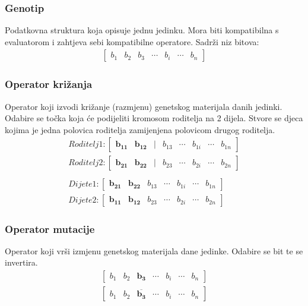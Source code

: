 \documentclass[times, utf8, zavrsni]{fer}
\begin{document}
\subsubsection{Genotip}
Podatkovna struktura koja opisuje jednu jedinku. Mora biti kompatibilna s evaluatorom i zahtjeva sebi kompatibilne operatore. Sadrži niz bitova:
\begin{align*}
\begin{bmatrix}
b_1 & b_2 & b_3 & \cdots & b_i & \cdots & b_n
\end{bmatrix}
\end{align*}
\subsubsection{Operator križanja}
Operator koji izvodi križanje (razmjenu) genetskog materijala danih jedinki. Odabire se točka koja će podijeliti kromosom roditelja na 2 dijela. Stvore se djeca kojima je jedna polovica roditelja zamijenjena polovicom drugog roditelja.
\begin{align*}
Roditelj 1:
\begin{bmatrix}
\mathbf{b_{11}} & \mathbf{b_{12}} & | & b_{13} & \cdots & b_{1i} & \cdots & b_{1n}
\end{bmatrix} \\
Roditelj 2:
\begin{bmatrix}
\mathbf{b_{21}} & \mathbf{b_{22}} & | & b_{23} & \cdots & b_{2i} & \cdots & b_{2n}
\end{bmatrix} \\\\
Dijete 1:
\begin{bmatrix}
\mathbf{b_{21}} & \mathbf{b_{22}} & b_{13} & \cdots & b_{1i} & \cdots & b_{1n}
\end{bmatrix} \\
Dijete 2:
\begin{bmatrix}
\mathbf{b_{11}} & \mathbf{b_{12}} & b_{23} & \cdots & b_{2i} & \cdots & b_{2n}
\end{bmatrix}
\end{align*}

\subsubsection{Operator mutacije}
Operator koji vrši izmjenu genetskog materijala dane jedinke. Odabire se bit te se invertira.
\begin{align*}
\begin{bmatrix}
b_1 & b_2 & \mathbf{b_3} & \cdots & b_i & \cdots & b_n
\end{bmatrix}\\
\begin{bmatrix}
b_1 & b_2 & \overline{\mathbf{b_3}} & \cdots & b_i & \cdots & b_n
\end{bmatrix}
\end{align*}
\end{document}

